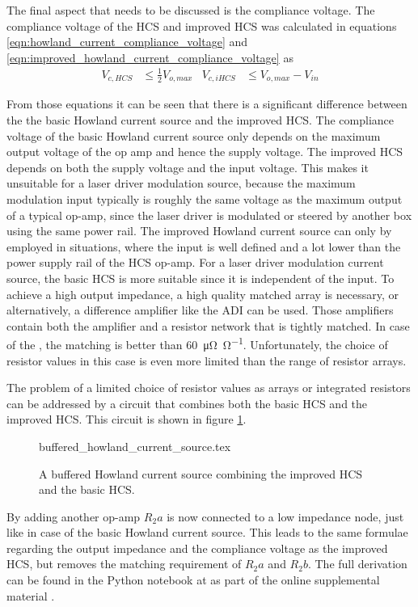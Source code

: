 The final aspect that needs to be discussed is the compliance voltage. The compliance voltage of the HCS and improved HCS was calculated in equations \ref{eqn:howland_current_compliance_voltage} and \ref{eqn:improved_howland_current_compliance_voltage} as
\begin{align*}
    V_{c, HCS} &\leq \frac{1}{2} V_{o,max} & V_{c, iHCS} &\leq V_{o,max} - V_{in}
\end{align*}

From those equations it can be seen that there is a significant difference between the the basic Howland current source and the improved HCS. The compliance voltage of the basic Howland current source only depends on the maximum output voltage of the op amp and hence the supply voltage. The improved HCS depends on both the supply voltage and the input voltage. This makes it unsuitable for a laser driver modulation source, because the maximum modulation input typically is roughly the same voltage as the maximum output of a typical op-amp, since the laser driver is modulated or steered by another box using the same power rail. The improved Howland current source can only by employed in situations, where the input is well defined and a lot lower than the power supply rail of the HCS op-amp. For a laser driver modulation current source, the basic HCS is more suitable since it is independent of the input. To achieve a high output impedance, a high quality matched array is necessary, or alternatively, a difference amplifier like the ADI  \cite{datasheet_LT1997} can be used. Those amplifiers contain both the amplifier and a resistor network that is tightly matched. In case of the , the matching is better than \qty{60}{\micro\ohm \per \ohm}. Unfortunately, the choice of resistor values in this case is even more limited than the range of resistor arrays.

The problem of a limited choice of resistor values as arrays or integrated resistors can be addressed by a circuit that combines both the basic HCS and the improved HCS. This circuit is shown in figure \ref{fig:buffered_howland_current_source}.
\begin{figure}[hb]
    \centering
        {buffered_howland_current_source.tex}
    \caption{A buffered Howland current source combining the improved HCS and the basic HCS.}
    \label{fig:buffered_howland_current_source}
\end{figure}

By adding another op-amp $R_2a$ is now connected to a low impedance node, just like in case of the basic Howland current source. This leads to the same formulae regarding the output impedance and the compliance voltage as the improved HCS, but removes the matching requirement of $R_2a$ and $R_2b$. The full derivation can be found in the Python notebook at  as part of the online supplemental material \cite{supplemental_material}.

